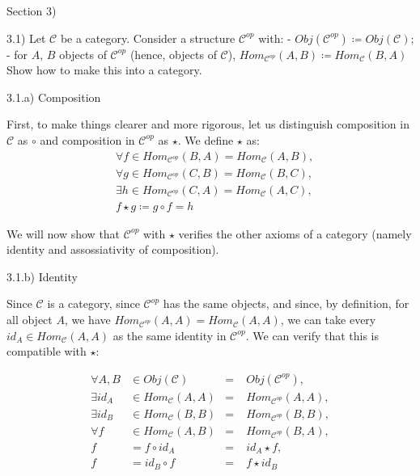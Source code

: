 Section 3)

3.1) Let $\mathcal{C}$ be a category. Consider a structure $\mathcal{C}^{op}$ with:
 - $Obj(\mathcal{C}^{op}) \coloneqq Obj(\mathcal{C})$;
 - for $A$, $B$ objects of $\mathcal{C}^{op}$ (hence, objects of $\mathcal{C}$), $Hom_{\mathcal{C}^{op}} (A, B) \coloneqq Hom_{\mathcal{C}} (B, A)$
Show how to make this into a category.

3.1.a) Composition

First, to make things clearer and more rigorous, let us distinguish composition in $\mathcal{C}$ as $\circ$ and composition in $\mathcal{C}^{op}$ as $\star$. We define $\star$ as:
$$
\begin{align*}
	& \forall f \in Hom_{\mathcal{C}^{op}} (B, A) = Hom_{\mathcal{C}} (A, B), \\
	& \forall g \in Hom_{\mathcal{C}^{op}} (C, B) = Hom_{\mathcal{C}} (B, C), \\
	& \exists h \in Hom_{\mathcal{C}^{op}} (C, A) = Hom_{\mathcal{C}} (A, C), \\
	& f \star g \coloneqq g \circ f = h
\end{align*}
$$

We will now show that $\mathcal{C}^{op}$ with $\star$ verifies the other axioms of a category (namely identity and assossiativity of composition).

3.1.b) Identity

Since $\mathcal{C}$ is a category, since $\mathcal{C}^{op}$ has the same objects, and since, by definition, for all object $A$, we have $Hom_{\mathcal{C}^{op}} (A, A) = Hom_{\mathcal{C}} (A, A)$, we can take every $id_A \in Hom_{\mathcal{C}}(A, A)$ as the same identity in $\mathcal{C}^{op}$. We can verify that this is compatible with $\star$:

$$
\begin{align*}
	\forall A, B & \in Obj (\mathcal{C})        &=& \;  Obj (\mathcal{C}^{op})        , \\
	\exists id_A & \in Hom_{\mathcal{C}} (A, A) &=& \;  Hom_{\mathcal{C}^{op}} (A, A) , \\
	\exists id_B & \in Hom_{\mathcal{C}} (B, B) &=& \;  Hom_{\mathcal{C}^{op}} (B, B) , \\
	\forall f    & \in Hom_{\mathcal{C}} (A, B) &=& \;  Hom_{\mathcal{C}^{op}} (B, A) , \\
	f            & =   f    \circ id_A          &=& \;  id_A \star f                  , \\
	f            & =   id_B \circ    f          &=& \;  f    \star id_B                 \\
\end{align*}
$$

